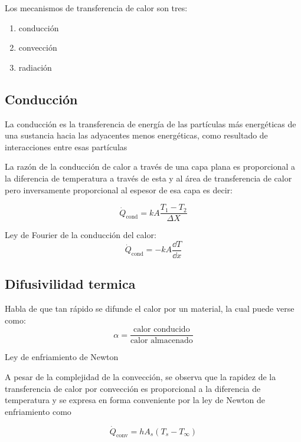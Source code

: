 \documentclass[11pt]{report}
\theoremstyle{plain}
\theoremstyle{definition}
\begin{document}
Los mecanismos de transferencia de calor son tres:
\begin{enumerate}
	\item conducción
	\item convección
	\item radiación
\end{enumerate}


\subsection{Conducción} %

La conducción es la transferencia de energía de las partículas más energéticas de una sustancia hacia las adyacentes menos energéticas, como resultado de interacciones entre esas partículas

La razón de la conducción de calor a través de una capa plana es proporcional a la diferencia de temperatura a través de esta y al área de transferencia de calor pero inversamente proporcional al espesor de esa capa es decir:

\begin{equation*}
	\dot{Q}_{\text{cond}} = kA\frac{T_1 - T_2}{\Delta X}
\end{equation*}

Ley de Fourier de la conducción del calor:
\begin{equation*}
	\dot{Q}_{\text{cond}} = -kA\frac{\dd{T}}{\dd{x}}
\end{equation*}

\subsection{Difusivilidad termica}

Habla de que tan rápido se difunde el calor por un material, la cual puede verse como:
\begin{equation*}
	\alpha = \frac{\text{calor conducido}}{\text{calor almacenado}}
\end{equation*}


Ley de enfriamiento de Newton

A pesar de la complejidad de la convección, se observa que la rapidez de la transferencia de calor por convección es proporcional a la diferencia de temperatura y se expresa en forma conveniente por la ley de Newton de enfriamiento como

\begin{equation}
	\dot{Q}_\text{conv} = hA_s(T_s-T_\infty)
	\label{eq:ley_enfriamiento_newton}
\end{equation}
\end{document}
